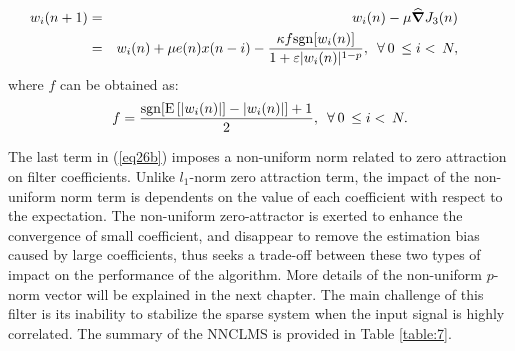 \begin{eqnarray}
\nonumber
\hspace{-0.8cm}w_{i}(n+1)&=&w_{i}(n)-\mu\widehat{\boldsymbol\nabla}J_{3}(n)\\
&=& w_{i}(n)+\mu e(n)x(n-i)- \frac{\kappa f\mathrm{sgn}[w_{i}(n)]}{1+\varepsilon|w_{i}(n)|^{1-p}}, \hspace{5pt}\forall\hspace{2pt} 0\hspace{2pt}\leq i<\hspace{2pt}N, \label{eq26b}
\end{eqnarray}
\noindent where $f$ can be obtained as:
\vspace{-0.6cm}
\begin{equation}
f=\frac{\mathrm{sgn}[\mathrm{E}\left[|w_{i}(n)|\right]-|w_{i}(n)|] + 1}{2},\hspace{5pt} \forall\hspace{2pt} 0\hspace{2pt}\leq i<\hspace{2pt}N. \label{eq27b}\vspace{-0.6cm}
\end{equation}

\noindent The last term in (\ref{eq26b}) imposes a non-uniform norm related to zero attraction on filter coefficients. Unlike $l_1$-norm zero attraction term, the impact of the non-uniform norm term is dependents on the value of each coefficient with respect to the expectation. The non-uniform zero-attractor is exerted to enhance the convergence of small coefficient, and disappear to remove the estimation bias caused by large coefficients, thus seeks a trade-off between these two types of impact on the performance of the algorithm. More details of the non-uniform $p$-norm vector will be explained in the next chapter. The main challenge of this filter is its inability to stabilize the sparse system when the input signal is highly correlated. The summary of the NNCLMS is provided in Table \ref{table:7}.

